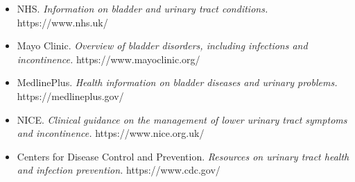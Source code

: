 \begin{itemize}
    \item NHS. \textit{Information on bladder and urinary tract conditions.} https://www.nhs.uk/
    \item Mayo Clinic. \textit{Overview of bladder disorders, including infections and incontinence.} https://www.mayoclinic.org/
    \item MedlinePlus. \textit{Health information on bladder diseases and urinary problems.} https://medlineplus.gov/
    \item NICE. \textit{Clinical guidance on the management of lower urinary tract symptoms and incontinence.} https://www.nice.org.uk/
    \item Centers for Disease Control and Prevention. \textit{Resources on urinary tract health and infection prevention.} https://www.cdc.gov/
\end{itemize}
